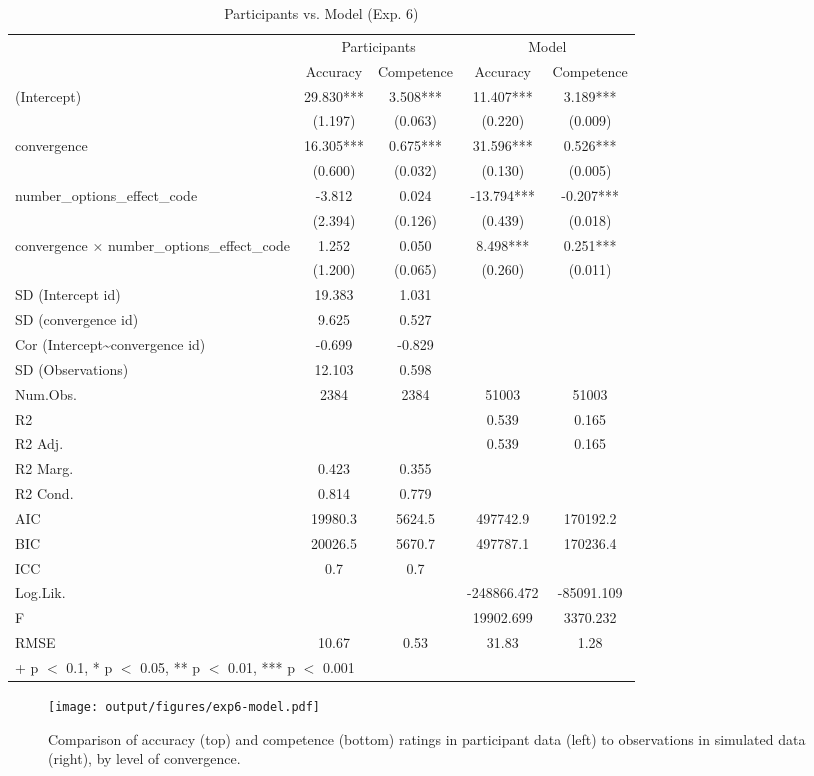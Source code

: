 \documentclass[
  doc,floatsintext]{apa6}
\begin{document}
\begin{table}

\caption{\label{tab:unnamed-chunk-91}Participants vs. Model (Exp. 6)}
\centering
\begin{tabular}[t]{lcccc}
\toprule
\multicolumn{1}{c}{ } & \multicolumn{2}{c}{Participants} & \multicolumn{2}{c}{Model} \\
\cmidrule(l{3pt}r{3pt}){2-3} \cmidrule(l{3pt}r{3pt}){4-5}
  & Accuracy & Competence & Accuracy  & Competence \\
\midrule
(Intercept) & 29.830*** & 3.508*** & 11.407*** & 3.189***\\
 & (1.197) & (0.063) & (0.220) & (0.009)\\
convergence & 16.305*** & 0.675*** & 31.596*** & 0.526***\\
 & (0.600) & (0.032) & (0.130) & (0.005)\\
number\_options\_effect\_code & -3.812 & 0.024 & -13.794*** & -0.207***\\
 & (2.394) & (0.126) & (0.439) & (0.018)\\
convergence × number\_options\_effect\_code & 1.252 & 0.050 & 8.498*** & 0.251***\\
 & (1.200) & (0.065) & (0.260) & (0.011)\\
SD (Intercept id) & 19.383 & 1.031 &  & \\
SD (convergence id) & 9.625 & 0.527 &  & \\
Cor (Intercept\textasciitilde{}convergence id) & -0.699 & -0.829 &  & \\
SD (Observations) & 12.103 & 0.598 &  & \\
\midrule
Num.Obs. & 2384 & 2384 & 51003 & 51003\\
R2 &  &  & 0.539 & 0.165\\
R2 Adj. &  &  & 0.539 & 0.165\\
R2 Marg. & 0.423 & 0.355 &  & \\
R2 Cond. & 0.814 & 0.779 &  & \\
AIC & 19980.3 & 5624.5 & 497742.9 & 170192.2\\
BIC & 20026.5 & 5670.7 & 497787.1 & 170236.4\\
ICC & 0.7 & 0.7 &  & \\
Log.Lik. &  &  & -248866.472 & -85091.109\\
F &  &  & 19902.699 & 3370.232\\
RMSE & 10.67 & 0.53 & 31.83 & 1.28\\
\bottomrule
\multicolumn{5}{l}{\rule{0pt}{1em}+ p $<$ 0.1, * p $<$ 0.05, ** p $<$ 0.01, *** p $<$ 0.001}\\
\end{tabular}
\end{table}



\begin{figure}
\centering
\texttt{[image: output/figures/exp6-model.pdf]}
\caption{\label{fig:exp6-model}Comparison of accuracy (top) and competence (bottom) ratings in participant data (left) to observations in simulated data (right), by level of convergence.}
\end{figure}
\end{document}
